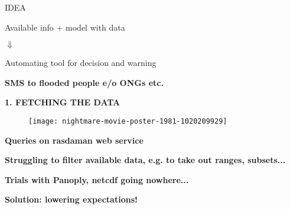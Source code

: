 \documentclass[xcolor=x11names,compress]{beamer}
\renewcommand{\(}{\begin{columns}}
\renewcommand{\)}{\end{columns}}
\newcommand{\<}[1]{\begin{column}{#1}}
\renewcommand{\>}{\end{column}}
\begin{document}
\begin{frame}{IDEA}
\large
\pause
\begin{block}{}
\bf\begin{center}  Available info + model with data \end{center} 
\end{block}
\pause
\begin{block}{}
\bf \begin{center} $\Downarrow$ \end{center}
\end{block}
\pause
\begin{block}{}
\bf  \begin{center} Automating tool for decision and warning \end{center}
\end{block}
\pause
\begin{block}{}
\bf  SMS to flooded people e/o ONGs etc.
\end{block}

\end{frame}


\begin{frame}{}
\begin{center}
\huge\bf\alert{1. FETCHING THE DATA}
\end{center}
\end{frame}


\begin{frame}{}
\begin{figure}\centering
	 \texttt{[image: nightmare-movie-poster-1981-1020209929]}
\end{figure}
\end{frame}


\begin{frame}{}
\large
\begin{block}{}
\bf Queries on rasdaman web service
\end{block}
\pause
\vspace{3 mm}
\begin{block}{}
\bf Struggling to filter available data, e.g. to take out \alert{ranges}, \alert{subsets}... 
\end{block}
\pause
\vspace{3 mm}
\begin{block}{}
\bf Trials with Panoply, netcdf going nowhere...
\end{block}

\end{frame}

\begin{frame}{}

\begin{center}\bf \huge\alert{Solution: lowering expectations!}\end{center}
\end{frame}
\end{document}
